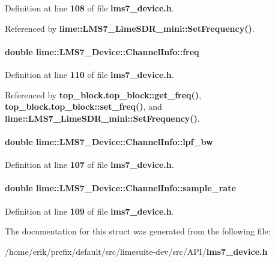 Definition at line {\bf 108} of file {\bf lms7\+\_\+device.\+h}.



Referenced by {\bf lime\+::\+L\+M\+S7\+\_\+\+Lime\+S\+D\+R\+\_\+mini\+::\+Set\+Frequency()}.

\paragraph[{freq}]{\setlength{\rightskip}{0pt plus 5cm}double lime\+::\+L\+M\+S7\+\_\+\+Device\+::\+Channel\+Info\+::freq}\label{structlime_1_1LMS7__Device_1_1ChannelInfo_a327d1c7a5cf3dd917283221f71da7bc3}


Definition at line {\bf 110} of file {\bf lms7\+\_\+device.\+h}.



Referenced by {\bf top\+\_\+block.\+top\+\_\+block\+::get\+\_\+freq()}, {\bf top\+\_\+block.\+top\+\_\+block\+::set\+\_\+freq()}, and {\bf lime\+::\+L\+M\+S7\+\_\+\+Lime\+S\+D\+R\+\_\+mini\+::\+Set\+Frequency()}.

\paragraph[{lpf\+\_\+bw}]{\setlength{\rightskip}{0pt plus 5cm}double lime\+::\+L\+M\+S7\+\_\+\+Device\+::\+Channel\+Info\+::lpf\+\_\+bw}\label{structlime_1_1LMS7__Device_1_1ChannelInfo_a65022990af0bfb84e119938bd3892c23}


Definition at line {\bf 107} of file {\bf lms7\+\_\+device.\+h}.

\paragraph[{sample\+\_\+rate}]{\setlength{\rightskip}{0pt plus 5cm}double lime\+::\+L\+M\+S7\+\_\+\+Device\+::\+Channel\+Info\+::sample\+\_\+rate}\label{structlime_1_1LMS7__Device_1_1ChannelInfo_a247d4a31f9f379f0fd8d8cbc04f121f6}


Definition at line {\bf 109} of file {\bf lms7\+\_\+device.\+h}.



The documentation for this struct was generated from the following file\+:\begin{DoxyCompactItemize}
\item 
/home/erik/prefix/default/src/limesuite-\/dev/src/\+A\+P\+I/{\bf lms7\+\_\+device.\+h}\end{DoxyCompactItemize}
